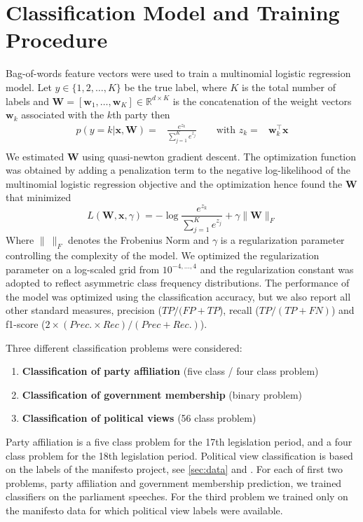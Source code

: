 \documentclass[runningheads,a4paper]{llncs}
\renewcommand{\vec}[1]{\mathbf{#1}}
\newcommand{\R}{\mathds{R}}
\begin{document}
\section{Classification Model and Training Procedure}\label{sec:model}
Bag-of-words feature vectors were used to train a multinomial logistic regression model. Let $y\in\{1,2,\dots,K\}$ be the true  label, where $K$ is the total number of labels and $\vec{W}=[\vec{w}_1,\dots,\vec{w}_K]\in\R^{d\times K}$ is the concatenation of the weight vectors $\vec{w}_k$ associated with the $k$th party then 
\begin{eqnarray}\label{eq:logreg_multiclass}
p(y=k|\vec{x},\vec{W}) = &\frac{e^{z_k}}{\sum_{j=1}^K e^{z_j}} \qquad \textrm{with }  z_k=&\vec{w}_k^{\top}\vec{x} \\\nonumber
\end{eqnarray}
%
We estimated $\vec{W}$ using quasi-newton gradient descent. The optimization function was obtained by adding a penalization term to the negative log-likelihood of the multinomial logistic regression objective and the optimization hence found the $\vec{W}$ that minimized
\begin{equation}\label{eq:objective}
L(\vec{W}, \vec{x}, \gamma) = - \log{\frac{e^{z_k}}{\sum_{j=1}^K e^{z_j}}}+ \gamma \| \vec{W} \|_{F}
\end{equation}
Where $\|~\|_F$ denotes the Frobenius Norm and $\gamma$ is a regularization parameter controlling the complexity of the model. 
 We optimized the regularization parameter on a log-scaled grid from $10^{-4,\dots,4}$ and the regularization constant was adopted to reflect asymmetric class frequency distributions. The performance of the model was optimized using the classification accuracy, but we also report all other standard measures, precision ($TP / (FP + TP$), recall ($TP / (TP + FN)$) and f1-score ($2\times (Prec. \times Rec) / (Prec + Rec.)$). 

Three different classification problems were considered: 
\begin{enumerate}
\item {\bf Classification of party affiliation} (five class / four class problem)
\item {\bf Classification of government membership} (binary problem)
\item {\bf Classification of political views} (56 class problem)
\end{enumerate}

Party affiliation is a five class problem for the 17th legislation period, and a four class problem for the 18th legislation period. Political view classification is based on the labels of the manifesto project, see \autoref{sec:data} and \cite{leftright}. 
For each of first two problems, party affiliation and government membership prediction, we trained classifiers on the parliament speeches. For the third problem we trained only on the manifesto data for which political view labels were available. 
\end{document}
